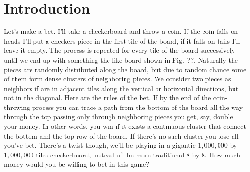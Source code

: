 \chapter{Introduction}
\label{ch1-intr}

Let's make a bet. I'll take a checkerboard and throw a coin. If the coin falls
on heads I'll put a checkers piece in the first tile of the board, if it falls
on tails I'll leave it empty. The process is repeated for every tile of the
board successively until we end up with something the like board shown in
Fig.~??. Naturally the pieces are randomly distributed along the board, but due
to random chance some of them form dense clusters of neighboring pieces. We
consider two pieces as neighbors if are in adjacent tiles along the vertical or
horizontal directions, but not in the diagonal. Here are the rules of the bet.
If by the end of the coin-throwing process you can trace a path from the bottom
of the board all the way through the top passing only through neighboring
pieces you get, say, double your money. In other words, you win if it exists a
continuous cluster that connect the bottom and the top row of the board. If
there's no such cluster you lose all you've bet. There's a twist though, we'll
be playing in a gigantic $1,000,000$ by $1,000,000$ tiles checkerboard, instead
of the more traditional 8 by 8. How much money would you be willing to bet in
this game?

